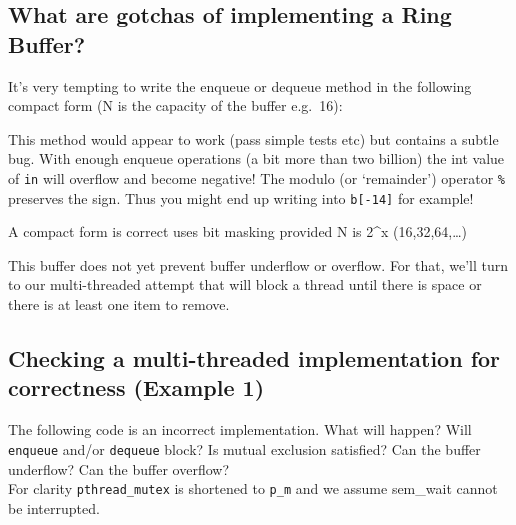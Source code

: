 \subsection{What are gotchas of implementing a Ring
Buffer?}\label{what-are-gotchas-of-implementing-a-ring-buffer}

It's very tempting to write the enqueue or dequeue method in the
following compact form (N is the capacity of the buffer e.g.~16):

\begin{Shaded}
\end{Shaded}

This method would appear to work (pass simple tests etc) but contains a
subtle bug. With enough enqueue operations (a bit more than two billion)
the int value of \texttt{in} will overflow and become negative! The
modulo (or `remainder') operator \texttt{\%} preserves the sign. Thus
you might end up writing into \texttt{b{[}-14{]}} for example!

A compact form is correct uses bit masking provided N is 2\^{}x
(16,32,64,\ldots{})

\begin{Shaded}
\begin{Highlighting}[]
\NormalTok{b[ (in++) & (N}\NormalTok{) ] = value;}
\end{Highlighting}
\end{Shaded}

This buffer does not yet prevent buffer underflow or overflow. For that,
we'll turn to our multi-threaded attempt that will block a thread until
there is space or there is at least one item to remove.

\subsection{Checking a multi-threaded implementation for correctness
(Example
1)}\label{checking-a-multi-threaded-implementation-for-correctness-example-1}

The following code is an incorrect implementation. What will happen?
Will \texttt{enqueue} and/or \texttt{dequeue} block? Is mutual exclusion
satisfied? Can the buffer underflow? Can the buffer overflow?\\For
clarity \texttt{pthread\_mutex} is shortened to \texttt{p\_m} and we
assume sem\_wait cannot be interrupted.

